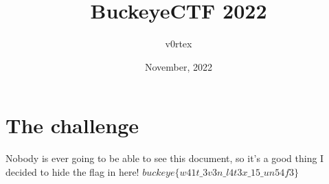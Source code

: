 \documentclass{article}
\title{BuckeyeCTF 2022}
\author{v0rtex}
\date{November, 2022}
\begin{document}
\maketitle

\section{The challenge}
Nobody is ever going to be able to see this document, so it's a good thing I decided to hide the flag in here! $buckeye\{w41t\_3v3n\_l4t3x\_15\_un54f3\}$
\end{document}
